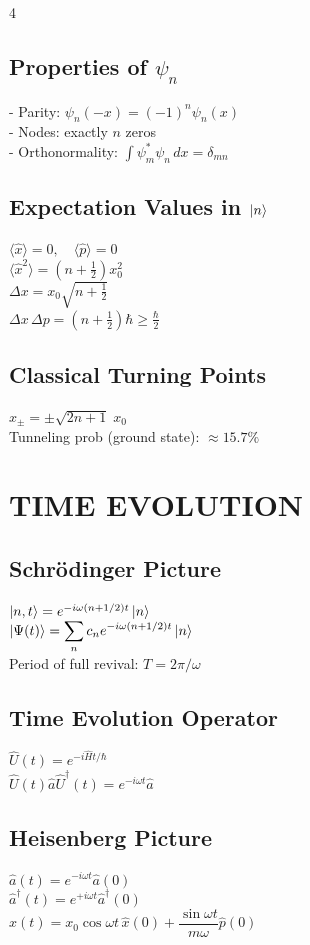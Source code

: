 \documentclass[10pt,landscape,a4paper]{article}
\newcommand{\aop}{\hat{a}}
\newcommand{\adop}{\hat{a}^{\dagger}}
\newcommand{\Hop}{\hat{H}}
\newcommand{\xop}{\hat{x}}
\newcommand{\pop}{\hat{p}}
\newcommand{\xzero}{x_0}
\newcommand{\half}{\tfrac{1}{2}}
\begin{document}
\begin{multicols}{4}
\subsection{Properties of $\psi_n$}
- Parity: $\psi_n(-x) = (-1)^n\psi_n(x)$\\
- Nodes: exactly $n$ zeros\\
- Orthonormality: $\int\psi_m^*\psi_n\,dx = \delta_{mn}$

\subsection{Expectation Values in $\ket{n}$}
$\langle\xop\rangle = 0,\quad\langle\pop\rangle = 0$\\[2pt]
$\langle\xop^2\rangle = (n+\half)\xzero^2$\\[2pt]
$\Delta x = \xzero\sqrt{n+\half}$\\[2pt]
$\Delta x\,\Delta p = (n+\half)\hbar \geq \tfrac{\hbar}{2}$

\subsection{Classical Turning Points}
$x_\pm = \pm\sqrt{2n+1}\;\xzero$\\[2pt]
Tunneling prob (ground state): $\approx 15.7\%$

\section{TIME EVOLUTION}

\subsection{Schrödinger Picture}
$\ket{n,t} = e^{-i\omega(n+1/2)t}\ket{n}$\\[3pt]
$\ket{\Psi(t)} = \displaystyle\sum_n c_n e^{-i\omega(n+1/2)t}\ket{n}$\\[3pt]
Period of full revival: $T = 2\pi/\omega$

\subsection{Time Evolution Operator}
$\hat{U}(t) = e^{-i\Hop t/\hbar}$\\[2pt]
$\hat{U}(t)\aop\hat{U}^\dagger(t) = e^{-i\omega t}\aop$

\subsection{Heisenberg Picture}
$\aop(t) = e^{-i\omega t}\aop(0)$\\[2pt]
$\adop(t) = e^{+i\omega t}\adop(0)$\\[3pt]
$\xop(t) = \xzero\cos\omega t\,\xop(0) + \dfrac{\sin\omega t}{m\omega}\pop(0)$


\end{multicols}
\end{document}
